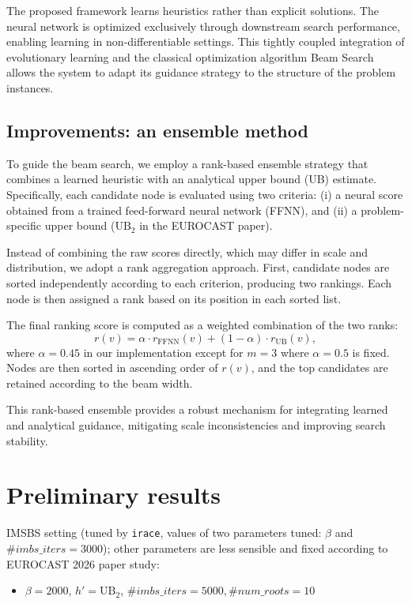 \documentclass[11pt,a4paper]{article}
\begin{document}
The proposed framework learns heuristics rather than explicit solutions. The neural network is optimized exclusively through downstream search performance, enabling learning in non-differentiable settings. This tightly coupled integration of evolutionary learning and the classical optimization algorithm Beam Search allows the system to adapt its guidance strategy to the structure of the problem instances.


\subsection{Improvements: an ensemble method}

To guide the beam search, we employ a rank-based ensemble strategy that combines a learned heuristic with an analytical upper bound (UB) estimate. Specifically, each candidate node is evaluated using two criteria: (i) a neural score obtained from a trained feed-forward neural network (FFNN), and (ii) a problem-specific upper bound ($\text{UB}_2$ in the EUROCAST paper). 

Instead of combining the raw scores directly, which may differ in scale and distribution, we adopt a rank aggregation approach. First, candidate nodes are sorted independently according to each criterion, producing two rankings. Each node is then assigned a rank based on its position in each sorted list. 

The final ranking score is computed as a weighted combination of the two ranks:
\[
r(v) = \alpha \cdot r_{\text{FFNN}}(v) + (1 - \alpha) \cdot r_{\text{UB}}(v),
\]
where $\alpha = 0.45$ in our implementation except for $m=3$ where $\alpha=0.5$ is fixed. Nodes are then sorted in ascending order of $r(v)$, and the top candidates are retained according to the beam width.

This rank-based ensemble provides a robust mechanism for integrating learned and analytical guidance, mitigating scale inconsistencies and improving search stability. 

\section{Preliminary results}



IMSBS setting (tuned by \texttt{irace}, values of two parameters tuned: $\beta$ and $\#imbs\_iters=3000$); other parameters are less sensible and fixed according to EUROCAST 2026 paper study:
\begin{itemize}
	\item     $\beta=2000$, $h'=\text{UB}_2$, $\#imbs\_iters=5000, \#num\_roots=10$
\end{itemize}
\end{document}
